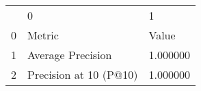 \begin{tabular}{lll}
 & 0 & 1 \\
0 & Metric & Value \\
1 & Average Precision & 1.000000 \\
2 & Precision at 10 (P@10) & 1.000000 \\
\end{tabular}
